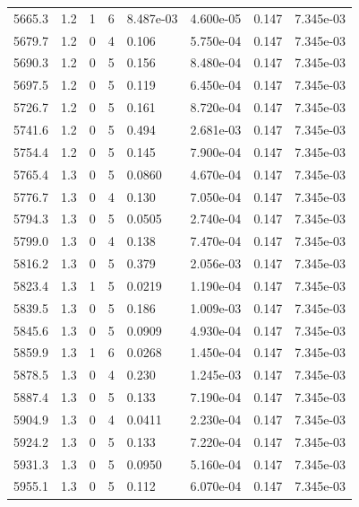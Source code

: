 \documentclass[preview]{standalone}
\begin{document}
{{{{{{{{{{{{\begin{tabular}{L{1.2cm}C{1.2cm} C{0.3cm}C{0.5cm} C{1.4cm}C{1.4cm} C{1.4cm}C{1.4cm}}
  5665.3  &   1.2  & 1     &  6 &  8.487e-03  & 4.600e-05  & 0.147 &  7.345e-03   \\ 
  5679.7  &   1.2  & 0     &  4 &  0.106  & 5.750e-04  & 0.147 &  7.345e-03   \\ 
  5690.3  &   1.2  & 0     &  5 &  0.156  & 8.480e-04  & 0.147 &  7.345e-03   \\ 
  5697.5  &   1.2  & 0     &  5 &  0.119  & 6.450e-04  & 0.147 &  7.345e-03   \\ 
  5726.7  &   1.2  & 0     &  5 &  0.161  & 8.720e-04  & 0.147 &  7.345e-03   \\ 
  5741.6  &   1.2  & 0     &  5 &  0.494  & 2.681e-03  & 0.147 &  7.345e-03   \\ 
  5754.4  &   1.2  & 0     &  5 &  0.145  & 7.900e-04  & 0.147 &  7.345e-03   \\ 
  5765.4  &   1.3  & 0     &  5 &  0.0860  & 4.670e-04  & 0.147 &  7.345e-03   \\ 
  5776.7  &   1.3  & 0     &  4 &  0.130  & 7.050e-04  & 0.147 &  7.345e-03   \\ 
  5794.3  &   1.3  & 0     &  5 &  0.0505  & 2.740e-04  & 0.147 &  7.345e-03   \\ 
  5799.0  &   1.3  & 0     &  4 &  0.138  & 7.470e-04  & 0.147 &  7.345e-03   \\ 
  5816.2  &   1.3  & 0     &  5 &  0.379  & 2.056e-03  & 0.147 &  7.345e-03   \\ 
  5823.4  &   1.3  & 1     &  5 &  0.0219  & 1.190e-04  & 0.147 &  7.345e-03   \\ 
  5839.5  &   1.3  & 0     &  5 &  0.186  & 1.009e-03  & 0.147 &  7.345e-03   \\ 
  5845.6  &   1.3  & 0     &  5 &  0.0909  & 4.930e-04  & 0.147 &  7.345e-03   \\ 
  5859.9  &   1.3  & 1     &  6 &  0.0268  & 1.450e-04  & 0.147 &  7.345e-03   \\ 
  5878.5  &   1.3  & 0     &  4 &  0.230  & 1.245e-03  & 0.147 &  7.345e-03   \\ 
  5887.4  &   1.3  & 0     &  5 &  0.133  & 7.190e-04  & 0.147 &  7.345e-03   \\ 
  5904.9  &   1.3  & 0     &  4 &  0.0411  & 2.230e-04  & 0.147 &  7.345e-03   \\ 
  5924.2  &   1.3  & 0     &  5 &  0.133  & 7.220e-04  & 0.147 &  7.345e-03   \\ 
  5931.3  &   1.3  & 0     &  5 &  0.0950  & 5.160e-04  & 0.147 &  7.345e-03   \\ 
  5955.1  &   1.3  & 0     &  5 &  0.112  & 6.070e-04  & 0.147 &  7.345e-03   \\ 

\end{tabular}}}}}}}}}}}}}
\end{document}
